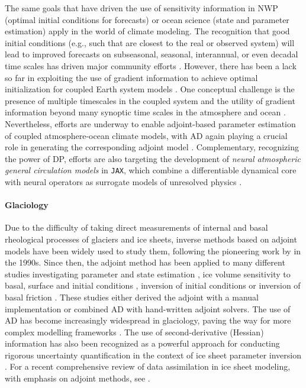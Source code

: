 The same goals that have driven the use of sensitivity information in NWP (optimal initial conditions for forecasts) or ocean science (state and parameter estimation) apply in the world of climate modeling.
The recognition that good initial conditions (e.g., such that are closest to the real or observed system) will lead to improved forecasts on subseasonal, seasonal, interannual, or even decadal time scales has driven major community efforts \cite{Meehl.2021}. 
However, there has been a lack so far in exploiting the use of gradient information to achieve optimal initialization for coupled Earth system models \cite{Frolov.2023}. 
One conceptual challenge is the presence of multiple timescales in the coupled system and the utility of gradient information beyond many synoptic time scales in the atmosphere and ocean \cite{Lea.2000,Lea:2002cv}.
Nevertheless, efforts are underway to enable adjoint-based parameter estimation of coupled atmosphere-ocean climate models, with AD again playing a crucial role in generating the corresponding adjoint model
\cite{Blessing.2014,Lyu.2018,Stammer:2018de}.
Complementary, recognizing the power of DP, efforts are also targeting the development of \textit{neural atmospheric general circulation models} in \texttt{JAX}, which combine a differentiable dynamical core with neural operators as surrogate models of unresolved physics
\cite{Kochkov.2023}.

\paragraph{Glaciology}

Due to the difficulty of taking direct measurements of internal and basal rheological processes of glaciers and ice sheets, inverse methods based on adjoint models have been widely used to study them, following the pioneering work by \cite{macayeal1992basal} in the 1990s. 
Since then, the adjoint method has been applied to many different studies investigating parameter and state estimation \cite{Vieli.2006, goldberg2013parameter}, ice volume sensitivity to basal, surface and initial conditions \cite{heimbach2009greenland}, inversion of initial conditions \cite{mosbeux2016comparison} or inversion of basal friction \cite{Petra.2012, morlighem2013inversion}.
These studies either derived the adjoint with a manual implementation or combined AD with hand-written adjoint solvers. 
The use of AD has become increasingly widespread in glaciology, paving the way for more complex modelling frameworks \cite{hascoet2018source, Gaikwad.2023}. 
The use of second-derivative (Hessian) information has also been recognized as a powerful approach for conducting rigorous uncertainty quantification in the context of ice sheet parameter inversion \cite{Petra.2014,Isaac:2015hf}.
For a recent comprehensive review of data assimilation in ice sheet modeling, with emphasis on adjoint methods, see \cite{Morlighem.2023}.

